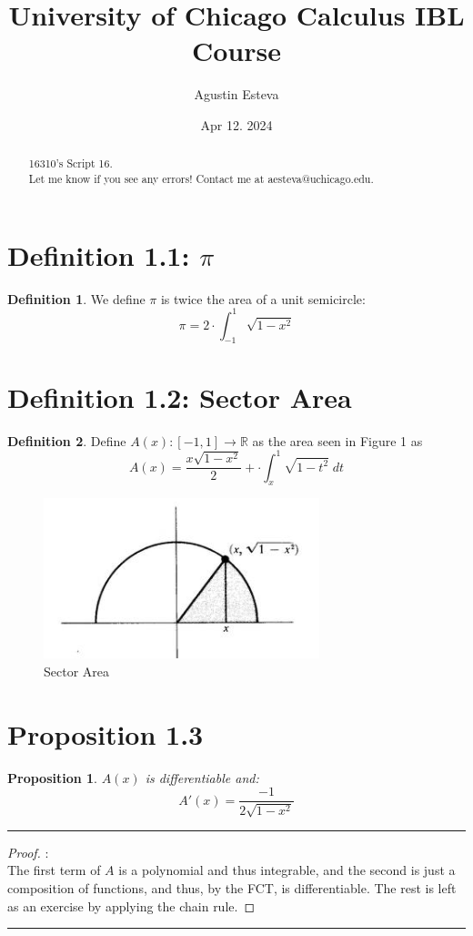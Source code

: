 \documentclass[openany, amssymb, psamsfonts]{amsart}
\title{University of Chicago Calculus IBL Course}
\author{Agustin Esteva}
\date{Apr 12. 2024}
\newcommand{\bbR}{\mathbb{R}}
\newtheorem{prop}{Proposition}[section]
\theoremstyle{definition}
\newtheorem{defn}{Definition}[section]
\numberwithin{equation}{section}
\begin{document}
\begin{abstract}

16310's Script 16.\\ Let me know if you see any errors! Contact me at aesteva@uchicago.edu.


\end{abstract}

\maketitle

\tableofcontents

\setcounter{section}{1}
\section*{Definition 1.1: $\pi$}
\begin{defn}
We define $\pi$ is twice the area of a unit semicircle:
\[\pi = 2 \cdot \int_{-1}^1\sqrt{1 - x^2}\]
\end{defn}

\section*{Definition 1.2: Sector Area}
\begin{defn}
Define $A(x): [-1,1]\to \bbR$ as the area seen in Figure 1 as \[A(x) = \frac{x \sqrt{1-x^2}}{2} + \cdot \int_{x}^1\sqrt{1 - t^2}\;dt\]
\begin{figure}[h!]
    \centering
    \includegraphics[width=0.5\linewidth]{Images/Trig1.png}
    \caption{Sector Area}
    \label{1.2}
\end{figure}
\end{defn}
\section*{Proposition 1.3}
\begin{prop}
$A(x)$ is differentiable and:
\[A'(x) = \frac{-1}{2\sqrt{1-x^2}}\]
\end{prop}
\vspace{4pt}     \hrule   \vspace{4pt}\begin{proof}:\\
The first term of $A$ is a polynomial and thus integrable, and the second is just a composition of functions, and thus, by the FCT, is differentiable. The rest is left as an exercise by applying the chain rule.
\end{proof}\vspace{4pt}     \hrule   \vspace{4pt}
\end{document}
